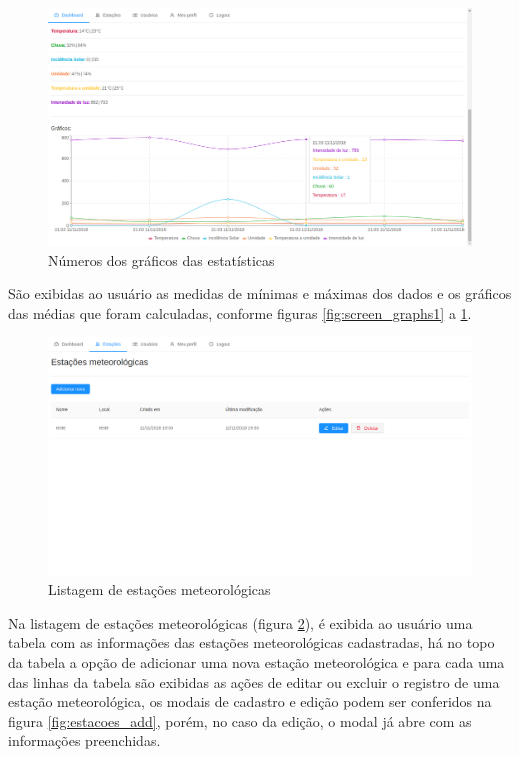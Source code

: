 \begin{figure}[H]
    \centering
    \caption{Números dos gráficos das estatísticas \label{fig:screen_graphs3}}
    \includegraphics[scale=0.3]{telas/grafico3.png}
    \hfill
{}
\end{figure}

São exibidas ao usuário as medidas de mínimas e máximas dos dados e os gráficos das médias que foram calculadas, conforme figuras \ref{fig:screen_graphs1} a \ref{fig:screen_graphs3}.

\begin{figure}[H]
    \centering
    \caption{Listagem de estações meteorológicas \label{fig:screen_estacoes}}
    \includegraphics[scale=0.3]{telas/estacoes.png}
    \hfill
{}
\end{figure}

Na listagem de estações meteorológicas (figura \ref{fig:screen_estacoes}), é exibida ao usuário uma tabela com as informações das estações meteorológicas cadastradas, há no topo da tabela a opção de adicionar uma nova estação meteorológica e para cada uma das linhas da tabela são exibidas as ações de editar ou excluir o registro de uma estação meteorológica, os modais de cadastro e edição podem ser conferidos na figura \ref{fig:estacoes_add}, porém, no caso da edição, o modal já abre com as informações preenchidas.

